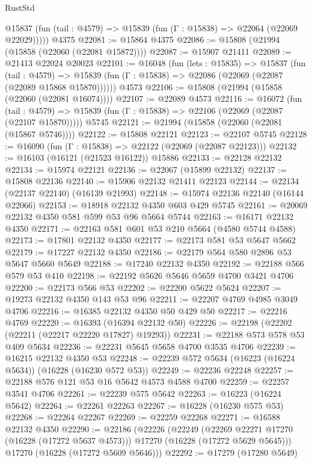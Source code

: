 \begin{lexlean}{RustStd}
\begin{coremodule}
      @15837 (fun (tail : @4579) => @15839 (fun (Γ : @15838) => @22064 (@22069 @22029)))))
    @4375
@22081 := @15864 @4375
@22086 := @15808 (@21994 (@15858 (@22060 (@22081 @15872))))
@22087 := @15907 @21411
@22089 := @21413 @22024 @20023
@22101 := @16048
    (fun (lets : @15835) =>
    @15837
      (fun (tail : @4579) =>
      @15839 (fun (Γ : @15838) => @22086 (@22069 (@22087 (@22089 @15868 @15870))))))
    @4573
@22106 := @15808 (@21994 (@15858 (@22060 (@22081 @16074))))
@22107 := @22089 @4573
@22116 := @16072
    (fun (tail : @4579) => @15839 (fun (Γ : @15838) => @22106 (@22069 (@22087 (@22107 @15870)))))
    @5745
@22121 := @21994 (@15858 (@22060 (@22081 (@15867 @5746))))
@22122 := @15808 @22121
@22123 := @22107 @5745
@22128 := @16090 (fun (Γ : @15838) => @22122 (@22069 (@22087 @22123)))
@22132 := @16103 (@16121 (@21523 @16122)) @15886
@22133 := @22128 @22132
@22134 := @15974 @22121
@22136 := @22067 (@15899 @22132)
@22137 := @15808 @22136
@22140 := @15906 @22132 @21411 @22123
@22144 := @22134 (@22137 @22140) (@16139 @21993)
@22148 := @15974 @22136 @22140 (@16144 @22066)
@22153 := @18918 @22132 @4350 @603 @429 @5745
@22161 := @20069 @22132 @4350 @581 @599 @53 @96 @5664 @5744
@22163 := @16171 @22132 @4350
@22171 := @22163 @581 @601 @53 @210 @5664 (@4580 @5744 @4588)
@22173 := @17801 @22132 @4350
@22177 := @22173 @581 @53 @5647 @5662
@22179 := @17227 @22132 @4350
@22186 := @22179 @564 @580 @2896 @53 @5647 @5660 @5649
@22188 := @17240 @22132 @4350
@22192 := @22188 @566 @579 @53 @410
@22198 := @22192 @5626 @5646 @5659 @4700 @3421 @4706
@22200 := @22173 @566 @53
@22202 := @22200 @5622 @5624
@22207 := @19273 @22132 @4350 @143 @53 @96
@22211 := @22207 @4769 @4985 @3049 @4706
@22216 := @16385 @22132 @4350 @50 @429 @50
@22217 := @22216 @4769
@22220 := @16393 (@16394 @22132 @50)
@22226 := @22198 (@22202 (@22211 (@22217 @22220 @17827) @19293))
@22231 := @22188 @573 @578 @53 @409 @5634
@22236 := @22231 @5645 @5658 @4700 @3535 @4706
@22239 := @16215 @22132 @4350 @53
@22248 := @22239 @572 @5634 (@16223 (@16224 @5634)) (@16228 (@16230 @572 @53))
@22249 := @22236 @22248
@22257 := @22188 @576 @121 @53 @16 @5642 @4573 @4588 @4700
@22259 := @22257 @3541 @4706
@22261 := @22239 @575 @5642
@22263 := @16223 (@16224 @5642)
@22264 := @22261 @22263
@22267 := @16228 (@16230 @575 @53)
@22268 := @22264 @22267
@22269 := @22259 @22268
@22271 := @16588 @22132 @4350
@22290 := @22186
    (@22226
      (@22249
        (@22269 @22271 @17270 (@16228 (@17272 @5637 @4573)))
        @17270
        (@16228 (@17272 @5629 @5645)))
      @17270
      (@16228 (@17272 @5609 @5646)))
@22292 := @17279 (@17280 @5649)

\end{coremodule}
\end{lexlean}
